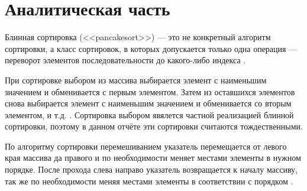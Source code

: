 \section{Аналитическая часть}

Блинная сортировка (<<pancakesort>>) --- это не конкретный алгоритм сортировки, а класс сортировок, в которых допускается только одна операция --- переворот элементов последовательности до какого-либо индекса \cite{вашинко2018блинная}. 

При сортировке выбором из массива выбирается элемент с наименьшим значением и обменивается с первым элементом. 
Затем из оставшихся элементов снова выбирается элемент с наименьшим значением и обменивается со вторым элементом, и т.д. \cite{сейдаметова2015педагогическая}.
Сортировка выбором явялется частной реализацией блинной сортировки, поэтому в данном отчёте эти сортировки считаются тождественными.

По алгоритму сортировки перемешиванием указатель перемещается от левого края массива да правого и по необходимости меняет местами элементы в нужном порядке. После прохода слева направо указатель возвращается к началу массиву, так же по необходимости меняя местами элементы в соответствии с порядком \cite{прохоренко2021сравнительный}. 